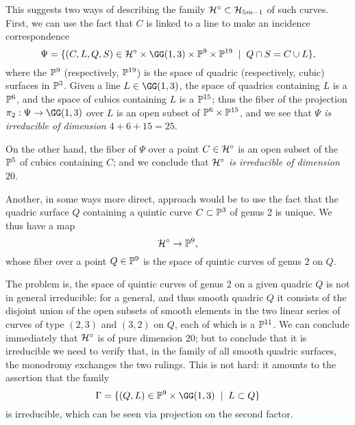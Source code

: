 This suggests two ways of describing the family $\cH^\circ \subset \cH_{5m-1}$ of such curves. First, we can use the fact that $C$ is linked to a line to make an incidence correspondence
$$
\Psi = \{ (C, L, Q, S) \in \cH^\circ \times \GG(1,3) \times \PP^9 \times \PP^{19} \; \mid \; Q \cap S = C \cup L \},
$$
where the $\PP^9$ (respectively, $\PP^{19}$) is the space of quadric (respectively, cubic) surfaces in $\PP^3$. Given a line $L \in \GG(1,3)$, the space of quadrics containing $L$ is a $\PP^6$, and the space of cubics containing $L$ is a $\PP^{15}$; thus the fiber of the projection $\pi_2 : \Psi \to \GG(1,3)$ over $L$ is an open subset of $\PP^6 \times \PP^{15}$, and we see that \emph{$\Psi$ is irreducible of dimension $4 + 6 + 15 = 25$}.

On the other hand, the fiber of $\Psi$ over a point $C \in \cH^\circ$ is an open subset of the $\PP^5$ of cubics containing $C$; and we conclude that \emph{$\cH^\circ$ is irreducible of dimension $20$}.

Another, in some ways more direct, approach would be to use the fact that the quadric surface $Q$ containing a quintic curve $C \subset \PP^3$ of genus 2 is unique. We thus have a map
$$
\cH^\circ \to \PP^9,
$$
whose fiber over a point $Q \in \PP^9$ is the space of quintic curves of genus 2 on $Q$. 

The problem is, the space of quintic curves of genus 2 on a given quadric $Q$ is not in general irreducible: for a general, and thus smooth quadric $Q$ it consists of the disjoint union of the open subsets of smooth elements in the two linear series of curves of type $(2,3)$ and $(3,2)$ on $Q$, each of which is a $\PP^{11}$. We can conclude immediately that $\cH^\circ$ is of pure dimension 20; but to conclude that it is irreducible we need to verify that, in the family of all smooth quadric surfaces, the monodromy exchanges the two rulings.  This is not hard: it amounts to the assertion that the family
$$
\Gamma = \{ (Q,L) \in \PP^9 \times \GG(1,3) \; \mid \; L \subset Q \}
$$
is irreducible, which can be seen via projection on the second factor.


